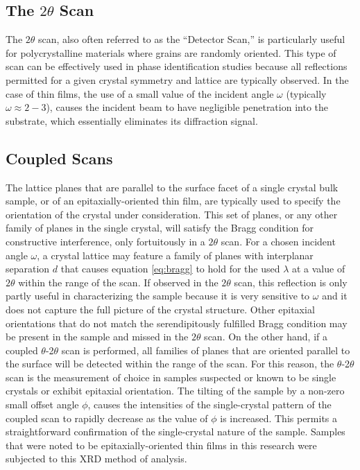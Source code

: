 \vspace{12pt}
\subsection{The $2\theta$ Scan}
The $2\theta$ scan, also often referred to as the ``Detector Scan,'' is particularly useful for polycrystalline materials where grains are randomly oriented. This type of  scan can be effectively used in phase identification studies because all reflections permitted for a given crystal symmetry and lattice are typically observed. In the case of thin films, the use of a small value of the incident angle $\omega$ (typically  $\omega \approx 2-3$\textdegree), causes the incident beam to have negligible penetration into the substrate, which essentially eliminates its diffraction signal. 

\vspace{12pt}
\subsection{Coupled Scans}
The lattice planes that are parallel to the surface facet of a single crystal bulk sample, or of an epitaxially-oriented thin film, are typically used to specify the orientation of the crystal under consideration. This set of planes, or any other family of planes in the single crystal, will satisfy the Bragg condition for constructive interference, only fortuitously in a $2\theta$ scan. For a chosen incident angle $\omega$, a crystal lattice may feature a family of planes with interplanar separation $d$ that causes equation \ref{eq:bragg} to hold for the  used $\lambda$ at a value of $2\theta$ within the range of the scan. If observed in the $2\theta$ scan, this reflection is only partly useful in characterizing the sample because it is very sensitive to $\omega$ and it does not capture the full picture of the crystal structure. Other epitaxial orientations that do not match the serendipitously fulfilled Bragg condition may be present in the sample and missed in the $2\theta$ scan. On the other hand, if a coupled $\theta$-2$\theta$ scan is performed, all families of planes that are oriented parallel to the surface will be detected within the range of the scan. For this reason, the $\theta$-2$\theta$ scan is the measurement of choice in samples suspected or known to be single crystals or exhibit epitaxial orientation. The tilting of the sample by a non-zero small offset angle $\phi$, causes the intensities of the single-crystal pattern of the coupled scan to rapidly decrease as the value  of $\phi$ is increased. This permits a straightforward confirmation of the single-crystal nature of the sample. Samples that were noted to be epitaxially-oriented thin films in this research were subjected to this XRD method of analysis.

